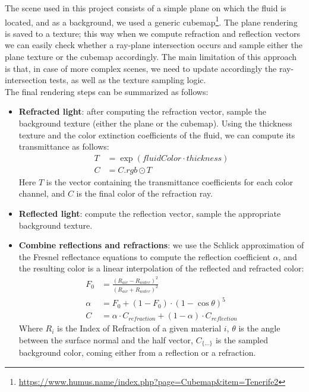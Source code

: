 \noindent
The scene used in this project consists of a simple plane on which the fluid is located, and as a background, we used a generic cubemap\footnote{\url{https://www.humus.name/index.php?page=Cubemap&item=Tenerife2}}. The plane rendering is saved to a texture; this way when we compute refraction and reflection vectors we can easily check whether a ray-plane intersection occurs and sample either the plane texture or the cubemap accordingly. The main limitation of this approach is that, in case of more complex scenes, we need to update accordingly the ray-intersection tests, as well as the texture sampling logic.\\

\noindent
The final rendering steps can be summarized as follows:
\begin{itemize}
    \item \textbf{Refracted light}: after computing the refraction vector, sample the background texture (either the plane or the cubemap). Using the thickness texture and the color extinction coefficients of the fluid, we can compute its transmittance as follows:
    \begin{align}
        T &= \exp{(fluidColor \cdot thickness)}\\
        C &= C.rgb \odot T        
    \end{align}
    Here $T$ is the vector containing the transmittance coefficients for each color channel, and $C$ is the final color of the refraction ray.

    \item \textbf{Reflected light}: compute the reflection vector, sample the appropriate background texture.
    \item \textbf{Combine reflections and refractions}: we use the Schlick approximation \cite{schlick1994inexpensive} of the Fresnel reflectance equations to compute the reflection coefficient $\alpha$, and the resulting color is a linear interpolation of the reflected and refracted color: 
    \begin{align}
        F_0 &= \frac{(R_{air} - R_{water})^2}{(R_{air} + R_{water})^2} \\
        \alpha &= F_0 + (1-F_0)\cdot(1-\cos\theta)^5\\
        C &= \alpha\cdot C_{refraction} + (1-\alpha)\cdot C_{reflection}
    \end{align}
    Where $R_i$ is the Index of Refraction of a given material $i$, $\theta$ is the angle between the surface normal and the half vector, $C_{\{...\}}$ is the sampled background color, coming either from a reflection or a refraction. 
\end{itemize}

